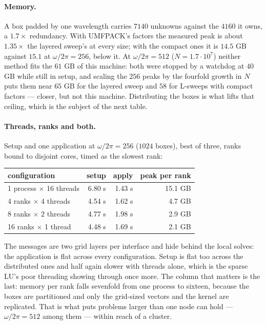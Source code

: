 \documentclass[11pt]{article}
\begin{document}
\paragraph{Memory.} A box padded by one wavelength carries $7140$ unknowns against the
$4160$ it owns, a $1.7\times$ redundancy. With UMFPACK's factors the measured peak is
about $1.35\times$ the layered sweep's at every size; with the compact ones it is $14.5$
GB against $15.1$ at $\omega/2\pi=256$, below it. At $\omega/2\pi=512$
($N=1.7\cdot10^{7}$) neither method fits the $61$ GB of this machine: both were stopped by
a watchdog at $40$ GB while still in setup, and scaling the $256$ peaks by the fourfold
growth in $N$ puts them near $65$ GB for the layered sweep and $58$ for L-sweeps with
compact factors --- closer, but not this machine. Distributing the boxes is what lifts
that ceiling, which is the subject of the next table.

\paragraph{Threads, ranks and both.} Setup and one application at $\omega/2\pi=256$
($1024$ boxes), best of three, ranks bound to disjoint cores, timed as the slowest rank:
\begin{center}\small
\begin{tabular}{lrrr}
\toprule
configuration & setup & apply & peak per rank \\
\midrule
1 process $\times$ 16 threads & 6.80 s & 1.43 s & 15.1 GB \\
4 ranks $\times$ 4 threads    & 4.54 s & 1.62 s & 4.7 GB \\
8 ranks $\times$ 2 threads    & 4.77 s & 1.98 s & 2.9 GB \\
16 ranks $\times$ 1 thread    & 4.48 s & 1.69 s & 2.1 GB \\
\bottomrule
\end{tabular}
\end{center}
The messages are two grid layers per interface and hide behind the local solves: the
application is flat across every configuration. Setup is flat too across the distributed
ones and half again slower with threads alone, which is the sparse LU's poor threading
showing through once more. The column that matters is the last: memory per rank falls
sevenfold from one process to sixteen, because the boxes are partitioned and only the
grid-sized vectors and the kernel are replicated. That is what puts problems larger than
one node can hold --- $\omega/2\pi=512$ among them --- within reach of a cluster.
\end{document}
